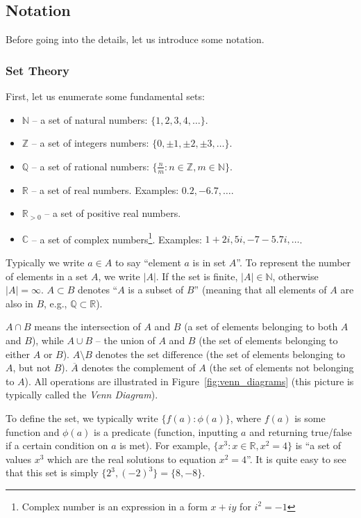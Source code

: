 \documentclass[../lecture-notes.tex]{subfiles}
\begin{document}
\subsection{Notation}

Before going into the details, let us introduce some notation.

\subsubsection{Set Theory}
First, let us enumerate some fundamental sets:
\begin{itemize}
    \item $\mathbb{N}$ -- a set of natural numbers: $\{1, 2, 3, 4, \dots\}$.
    \item $\mathbb{Z}$ -- a set of integers numbers: $\{0, \pm 1, \pm 2, \pm 3, \dots\}$.
    \item $\mathbb{Q}$ -- a set of rational numbers: $\{\frac{n}{m}: n \in \mathbb{Z}, m \in \mathbb{N}\}$.
    \item $\mathbb{R}$ -- a set of real numbers. Examples: $0.2, -6.7, \dots$.
    \item $\mathbb{R}_{>0}$ -- a set of positive real numbers.
    \item $\mathbb{C}$ -- a set of complex numbers\footnote{Complex number is an expression in a form $x+iy$ for $i^2=-1$}. Examples: $1+2i, 5i, -7-5.7i, \dots$.
\end{itemize}

Typically we write $a \in A$ to say ``element $a$ is in set $A$''. To represent the number of elements in a set $A$, we write $|A|$. If the set is finite, $|A| \in \mathbb{N}$, otherwise 
$|A| = \infty$. $A \subset B$ denotes ``$A$ is a subset of $B$'' (meaning that all elements of $A$ are also in $B$, e.g., $\mathbb{Q} \subset \mathbb{R}$).

$A \cap B$ means the intersection of $A$ and $B$ (a set of elements belonging to both $A$ and $B$), while $A \cup B$ -- the union of $A$ and $B$ (the set of elements belonging to either $A$ or $B$). $A \setminus B$ denotes the set difference (the set of elements belonging to $A$, but not $B$). $\overline{A}$ denotes the complement of $A$ (the set of elements not belonging to $A$). All operations are illustrated in Figure~\ref{fig:venn_diagrams} (this picture is typically called the \textit{Venn Diagram}).

To define the set, we typically write $\{f(a): \phi(a)\}$, where $f(a)$ is some function and $\phi(a)$ is a predicate (function, inputting $a$ and returning true/false if a certain condition on $a$ is met). For example, $\{x^3: x \in \mathbb{R}, x^2 = 4\}$ is ``a set of values $x^3$ which are the real solutions to equation $x^2 = 4$''. It is quite easy to see that this set is simply $\{2^3, (-2)^3\} = \{8,-8\}$. 
\end{document}
